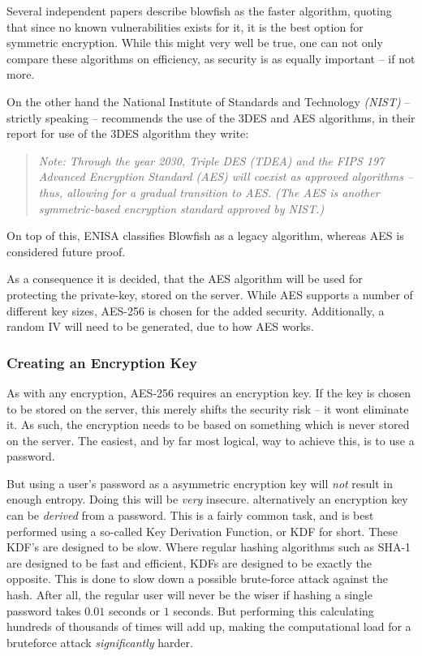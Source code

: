 				Several independent papers describe blowfish as the faster algorithm, quoting that since no known vulnerabilities exists for it, it is the best option for symmetric encryption\cite{thakur2011aes,singh2011comparison,verma2011peformance,ramesh2013performance}. While this might very well be true, one can not only compare these algorithms on efficiency, as security is as equally important -- if not more. 

				On the other hand the National Institute of Standards and Technology \emph{(NIST)} -- strictly speaking -- recommends the use of the 3DES and AES algorithms\cite{barker2012sp}, in their report for use of the 3DES algorithm they write:
				\begin{quote}
					\emph{Note: Through the year 2030, Triple DES (TDEA) and the FIPS 197 Advanced Encryption Standard (AES) will coexist as approved algorithms – thus, allowing for a gradual transition to AES. (The AES is another symmetric-based encryption standard approved by NIST.)}\\
					\cite{barker2012sp}
				\end{quote}
				On top of this, ENISA classifies Blowfish as a legacy algorithm, whereas AES is considered future proof\cite[p.20]{enisa}.

				As a consequence it is decided, that the AES algorithm will be used for protecting the private-key, stored on the server. While AES supports a number of different key sizes, AES-256 is chosen for the added security. Additionally, a random IV will need to be generated, due to how AES works.

			\subsubsection{Creating an Encryption Key}
				\label{sec:kdf}
				As with any encryption, AES-256 requires an encryption key. If the key is chosen to be stored on the server, this merely shifts the security risk -- it wont eliminate it. As such, the encryption needs to be based on something which is never stored on the server. The easiest, and by far most logical, way to achieve this, is to use a password. 

				But using a user's password as a asymmetric encryption key will \emph{not} result in enough entropy. Doing this will be \emph{very} insecure. alternatively an encryption key can be \emph{derived} from a password. This is a fairly common task, and is best performed using a so-called Key Derivation Function, or KDF for short. These KDF's are designed to be slow. Where regular hashing algorithms such as SHA-1 are designed to be fast and efficient, KDFs are designed to be exactly the opposite. This is done to slow down a possible brute-force attack against the hash. After all, the regular user will never be the wiser if hashing a single password takes $0.01$ seconds or $1$ seconds. But performing this calculating hundreds of thousands of times will add up, making the computational load for a bruteforce attack \emph{significantly} harder. 

